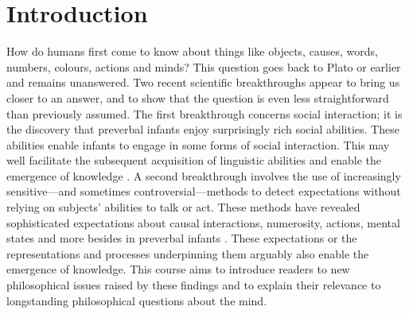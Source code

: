 \documentclass[12pt,\papersize]{extarticle}
\date{}
\begin{document}
\setlength\footnotesep{1em}





\maketitle

\setcounter{secnumdepth}{-1} 


\section{Introduction}
How do humans first come to know about things like objects, causes, words, numbers, colours, actions and minds?  
This question goes back to Plato or earlier and remains unanswered.
Two recent scientific breakthroughs appear to bring us closer to an answer, and to show that the question is even less straightforward than previously  assumed.
The first breakthrough concerns social interaction;
it is the discovery that preverbal infants enjoy surprisingly rich social abilities.
These abilities enable infants to engage in some forms of social interaction. 
This may well facilitate the subsequent acquisition of linguistic abilities and enable the emergence of knowledge \citep[e.g.][]{Csibra:2009xr,Meltzoff:2007pj,Tomasello:2005wx}. 
A second breakthrough involves the use of increasingly sensitive---and sometimes controversial---methods to detect  expectations without relying on subjects' abilities to talk or act.  
These methods have revealed sophisticated expectations about  causal interactions, numerosity, actions, mental states and more besides in preverbal infants \citep[e.g.][]{Spelke:1990jn,Baillargeon:gx}.
These expectations or the representations and processes underpinning them arguably also enable the emergence of knowledge. 
This course aims to introduce readers to  
new philosophical issues raised by these findings  
and to explain their relevance to longstanding philosophical questions about the mind.  
\end{document}
